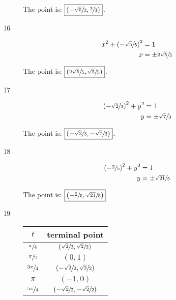 \documentclass{exam}
\begin{document}
\begin{description}
        The point is: $\boxed{ \left( - \sfrac{\sqrt{5}}{3}, \sfrac{2}{3} \right) }$.

      \item[16]
        \begin{align*}
          x^2 + \left( - \sfrac{\sqrt{5}}{5} \right)^2 & = 1 \\
          x                                  & = \pm \sfrac{2 \sqrt{5}}{5} \\
        \end{align*}

        The point is: $\boxed{ \left( \sfrac{2 \sqrt{5}}{5}, \sfrac{\sqrt{5}}{5} \right) }$.

      \item[17]
        \begin{align*}
          \left( - \sfrac{\sqrt{2}}{3} \right)^2 + y^2 & = 1 \\
          y                                           & = \pm \sfrac{\sqrt{7}}{3} \\
        \end{align*}

        The point is: $\boxed{ \left( - \sfrac{\sqrt{2}}{3}, - \sfrac{\sqrt{7}}{3} \right) }$.

      \item[18]
        \begin{align*}
          \left( - \sfrac{2}{5} \right)^2 + y^2 & = 1 \\
          y                                    & = \pm \sfrac{\sqrt{21}}{5} \\
        \end{align*}

        The point is: $\boxed{ \left( - \sfrac{2}{5}, \sfrac{\sqrt{21}}{5} \right) }$.

      \item[19]
        \begin{tabular}{cc}
          \toprule
          $t$ & terminal point \\
          \midrule
          $\sfrac{\pi}{4}$ & $\left( \sfrac{\sqrt{2}}{2}, \sfrac{\sqrt{2}}{2} \right)$ \\

          $\sfrac{\pi}{2}$ & $\left( 0, 1 \right)$ \\
          $\sfrac{3 \pi}{4}$ & $\left( -\sfrac{\sqrt{2}}{2}, \sfrac{\sqrt{2}}{2} \right)$ \\

          $\pi$ & $\left( -1, 0 \right)$ \\
          $\sfrac{5 \pi}{4}$ & $\left( -\sfrac{\sqrt{2}}{2}, -\sfrac{\sqrt{2}}{2} \right)$ \\


\end{tabular}
\end{description}
\end{document}
